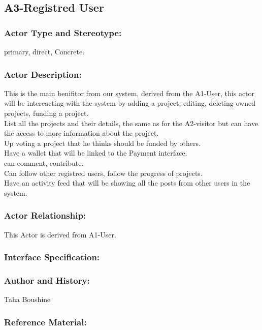 \documentclass[11pt, openany]{report}
\begin{document}
\clearpage

\subsection{A3-Registred User}
\label{A3}
\subsubsection{Actor Type and Stereotype:}
primary, direct, Concrete.
\subsubsection{Actor Description:}
This is the main benifitor from our system, derived from the A1-User, this actor will be intereacting with the system by adding a project, editing, deleting owned projects, funding a project.\\
List all the projects and their details, the same as for the A2-visitor but can have the access to more information about the project.\\
Up voting a project that he thinks should be funded by others.\\
Have a wallet that will be linked to the Payment interface.\\
can comment, contribute.\\
Can follow other registred users, follow the progress of projects.\\
Have an activity feed that will be showing all the posts from other users in the system.
\subsubsection{Actor Relationship:}
This Actor is derived from A1-User.
\subsubsection{Interface Specification:}
\subsubsection{Author and History:}
Taha Boushine
\subsubsection{Reference Material:}
\end{document}
